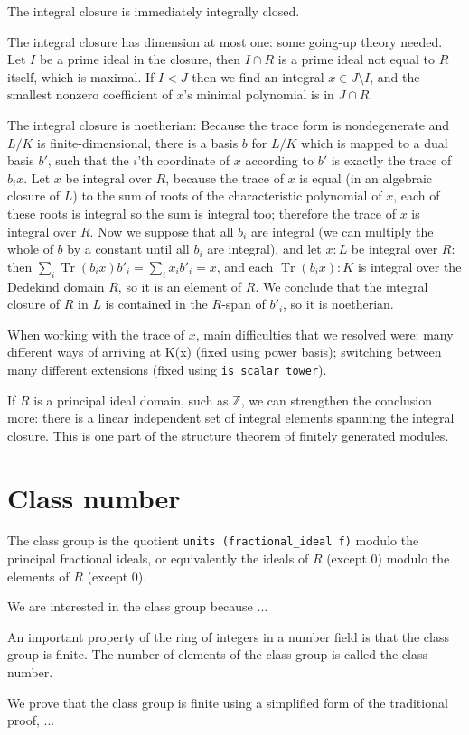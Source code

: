 \documentclass{lipics-v2021}
\newcommand{\lean}[1]{\texttt{#1}\xspace} %
\DeclareMathOperator{\Tr}{\mathrm{Tr}}
\newcommand{\Z}{\mathbb{Z}}
\begin{document}
The integral closure is immediately integrally closed.

The integral closure has dimension at most one: some going-up theory needed. Let $I$ be a prime ideal in the closure, then $I \cap R$ is a prime ideal not equal to $R$ itself, which is maximal. If $I < J$ then we find an integral $x \in J \setminus I$, and the smallest nonzero coefficient of $x$'s minimal polynomial is in $J \cap R$.

The integral closure is noetherian: Because the trace form is nondegenerate and $L / K$ is finite-dimensional, there is a basis $b$ for $L / K$ which is mapped to a dual basis $b'$, such that the $i$'th coordinate of $x$ according to $b'$ is exactly the trace of $b_i x$. Let $x$ be integral over $R$, because the trace of $x$ is equal (in an algebraic closure of $L$) to the sum of roots of the characteristic polynomial of $x$, each of these roots is integral so the sum is integral too; therefore the trace of $x$ is integral over $R$. Now we suppose that all $b_i$ are integral (we can multiply the whole of $b$ by a constant until all $b_i$ are integral), and let $x : L$ be integral over $R$: then $\sum_i \Tr(b_i x) b'_i = \sum_i x_i b'_i = x$, and each $\Tr(b_i x) : K$ is integral over the Dedekind domain $R$, so it is an element of $R$. We conclude that the integral closure of $R$ in $L$ is contained in the $R$-span of $b'_i$, so it is noetherian.

When working with the trace of $x$, main difficulties that we resolved were: many different ways of arriving at K(x) (fixed using power basis); switching between many different extensions (fixed using \lean{is\_scalar\_tower}).

If $R$ is a principal ideal domain, such as $\Z$, we can strengthen the conclusion more: there is a linear independent set of integral elements spanning the integral closure. This is one part of the structure theorem of finitely generated modules.

\section{Class number}

The class group is the quotient \lean{units (fractional\_ideal f)} modulo the principal fractional ideals, or equivalently the ideals of $R$ (except $0$) modulo the elements of $R$ (except $0$).

We are interested in the class group because ...

An important property of the ring of integers in a number field is that the class group is finite. The number of elements of the class group is called the class number.

We prove that the class group is finite using a simplified form of the traditional proof, ...
\end{document}
